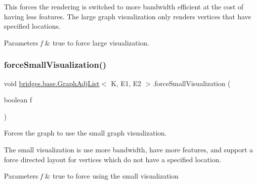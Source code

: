 This forces the rendering is switched to more bandwidth efficient at the cost of having less features. The large graph visualization only renders vertices that have specified locations.


\begin{DoxyParams}{Parameters}
{\em f} & true to force large visualization. \\
\hline
\end{DoxyParams}
\mbox{\label{classbridges_1_1base_1_1_graph_adj_list_ae14e51214742db0c4dab26c1d409f4ed}} 
\subsubsection{\texorpdfstring{forceSmallVisualization()}{forceSmallVisualization()}}
{\footnotesize\ttfamily void \mbox{\hyperlink{classbridges_1_1base_1_1_graph_adj_list}{bridges.\+base.\+Graph\+Adj\+List}}$<$ K, E1, E2 $>$.force\+Small\+Visualization (\begin{DoxyParamCaption}\item[{boolean}]{f }\end{DoxyParamCaption})}



Forces the graph to use the small graph visualization. 

The small visualization is use more bandwidth, have more features, and support a force directed layout for vertices which do not have a specified location.


\begin{DoxyParams}{Parameters}
{\em f} & true to force using the small visualization \\
\hline
\end{DoxyParams}
\mbox{\label{classbridges_1_1base_1_1_graph_adj_list_a77771e356aa8bf44525be9ae01603989}} 
